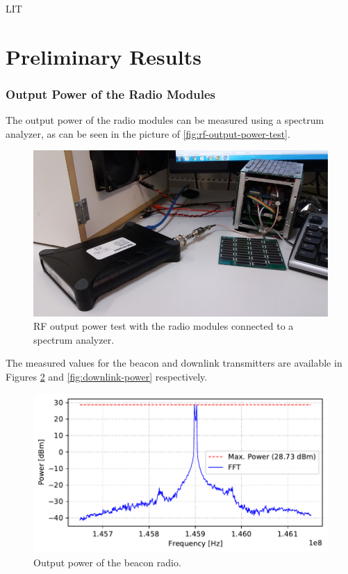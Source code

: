 LIT

\cite{marcelino2021}


\section{Preliminary Results}


\subsubsection{Output Power of the Radio Modules}

The output power of the radio modules can be measured using a spectrum analyzer, as can be seen in the picture of \autoref{fig:rf-output-power-test}.

\begin{figure}[!ht]
    \begin{center}
        \includegraphics[width=\textwidth]{figures/rf-output-power-test.jpg}
        \caption{RF output power test with the radio modules connected to a spectrum analyzer.}
        \label{fig:rf-output-power-test}
    \end{center}
\end{figure}

The measured values for the beacon and downlink transmitters are available in Figures \ref{fig:beacon-power} and \ref{fig:downlink-power} respectively.

\begin{figure}[!ht]
    \begin{center}
        \includegraphics[width=\textwidth]{curves/beacon_output_power.pdf}
        \caption{Output power of the beacon radio.}
        \label{fig:beacon-power}
    \end{center}
\end{figure}

